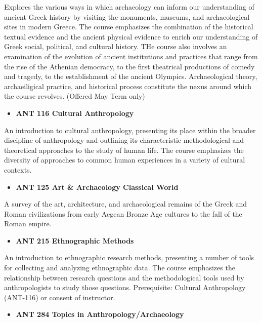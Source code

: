 \documentclass[
  letterpaper,
]{scrbook}
\providecommand{\tightlist}{%
  \setlength{\itemsep}{0pt}\setlength{\parskip}{0pt}}
\begin{document}
Explores the various ways in which archaeology can inform our
understanding of ancient Greek history by visiting the monuments,
museums, and archaeological sites in modern Greece. The course
emphasizes the combination of the historical textual evidence and the
ancient physical evidence to enrich our understanding of Greek social,
political, and cultural history. THe course also involves an examination
of the evolution of ancient institutions and practices that range from
the rise of the Athenian democracy, to the first theatrical productions
of comedy and tragedy, to the establishment of the ancient Olympics.
Archaeological theory, archaeiligical practice, and historical process
constitute the nexus around which the course revolves. (Offered May Term
only)

\begin{itemize}
\tightlist
\item
  \textbf{ANT 116 Cultural Anthropology}
\end{itemize}

An introduction to cultural anthropology, presenting its place within
the broader discipline of anthropology and outlining its characteristic
methodological and theoretical approaches to the study of human life.
The course emphasizes the diversity of approaches to common human
experiences in a variety of cultural contexts.

\begin{itemize}
\tightlist
\item
  \textbf{ANT 125 Art \& Archaeology Classical World}
\end{itemize}

A survey of the art, architecture, and archaeological remains of the
Greek and Roman civilizations from early Aegean Bronze Age cultures to
the fall of the Roman empire.

\begin{itemize}
\tightlist
\item
  \textbf{ANT 215 Ethnographic Methods}
\end{itemize}

An introduction to ethnographic research methods, presenting a number of
tools for collecting and analyzing ethnographic data. The course
emphasizes the relationship between research questions and the
methodological tools used by anthropologists to study those questions.
Prerequisite: Cultural Anthropology (ANT-116) or consent of instructor.

\begin{itemize}
\tightlist
\item
  \textbf{ANT 284 Topics in Anthropology/Archaeology}
\end{itemize}
\end{document}
